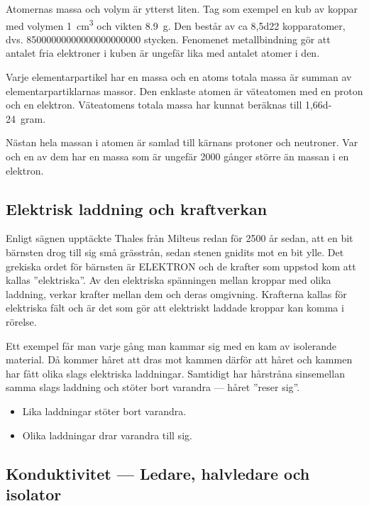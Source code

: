Atomernas massa och volym är ytterst liten.
Tag som exempel en kub av koppar med volymen \SI{1}{\centi\metre\cubed} och vikten
\SI{8,9}{\gram}. 
Den består av ca \num{8,5d22} kopparatomer, dvs.
\num{85 000 000 000 000 000 000 000} stycken.
Fenomenet metallbindning gör att antalet fria elektroner i kuben är ungefär lika
med antalet atomer i den.

Varje elementarpartikel har en massa och en atoms totala massa är summan av
elementarpartiklarnas massor.
Den enklaste atomen är väteatomen med en proton och en elektron.
Väteatomens totala massa har kunnat beräknas till \SI{1,66d-24}{gram}.

Nästan hela massan i atomen är samlad till kärnans protoner och neutroner.
Var och en av dem har en massa som är ungefär \num{2000} gånger större än massan i en
elektron.

\subsection{Elektrisk laddning och kraftverkan}

Enligt sägnen upptäckte Thales från Milteus redan för 2500 år sedan, att en bit
bärnsten drog till sig små grässtrån, sedan stenen gnidits mot en bit ylle.
Det grekiska ordet för bärnsten är ELEKTRON och de krafter som uppstod kom att
kallas ''elektriska''.
Av den elektriska spänningen mellan kroppar med olika laddning, verkar krafter
mellan dem och deras omgivning.
Krafterna kallas för elektriska fält och är det som gör att elektriskt laddade
kroppar kan komma i rörelse.

Ett exempel får man varje gång man kammar sig med en kam av isolerande material.
Då kommer håret att dras mot kammen därför att håret och kammen har
fått olika slags elektriska laddningar.
Samtidigt har hårstråna sinsemellan samma slags laddning och stöter bort
varandra --- håret ''reser sig''.

\begin{itemize}
	\item Lika laddningar stöter bort varandra.
	\item Olika laddningar drar varandra till sig.
\end{itemize}

\subsection{Konduktivitet --- Ledare, halvledare och isolator}

